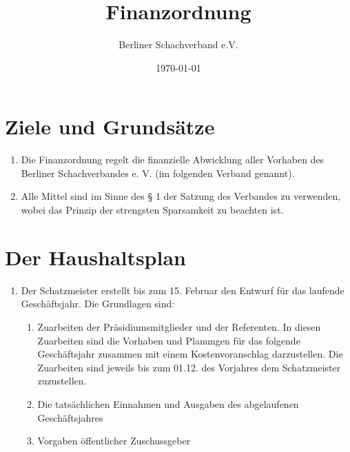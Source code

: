 \documentclass[fontsize=12pt, paper=a4, ngerman]{article}
\begin{document}
\author{ Berliner Schachverband e.V. } \title{Finanzordnung} \date{\today} \maketitle

\tableofcontents

\newpage

\section{Ziele und Grundsätze}

\begin{enumerate}
\item Die Finanzordnung regelt die finanzielle Abwicklung aller Vorhaben des Berliner
Schachverbandes e. V. (im folgenden Verband genannt).

\item Alle Mittel sind im Sinne des § 1 der Satzung des Verbandes zu verwenden, wobei das
Prinzip der strengsten Sparsamkeit zu beachten ist.
\end{enumerate}

\section{Der Haushaltsplan}

\begin{enumerate}
\item Der Schatzmeister erstellt bis zum 15. Februar den Entwurf für das laufende
Geschäftsjahr. Die Grundlagen sind:
  \begin{enumerate}[label=\alph*)]
  \item Zuarbeiten der Präsidiumsmitglieder und der Referenten. In diesen Zuarbeiten sind
  die Vorhaben und Planungen für das folgende Geschäftsjahr zusammen mit einem
  Kostenvoranschlag darzustellen. Die Zuarbeiten sind jeweils bis zum 01.12. des
  Vorjahres dem Schatzmeister zuzustellen.
  \item Die tatsächlichen Einnahmen und Ausgaben des abgelaufenen Geschäftsjahres
  \item Vorgaben öffentlicher Zuschussgeber
  \end{enumerate}

\end{enumerate}  
\end{document}
